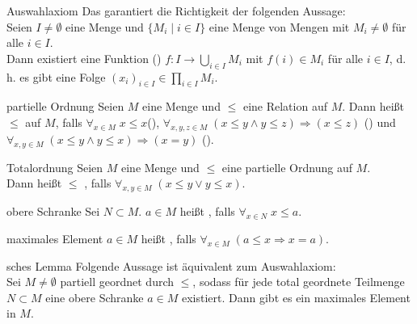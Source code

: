 \begin{Def}{Auswahlaxiom}
    Das  garantiert die Richtigkeit
    der folgenden Aussage:\\
    Seien $I \not= \emptyset$ eine Menge und
    $\{M_i \;|\; i \in I\}$ eine Menge von Mengen mit
    $M_i \not= \emptyset$ für alle $i \in I$.\\
    Dann existiert eine Funktion ()
    $f \colon I \rightarrow \bigcup_{i \in I} M_i$ mit
    $f(i) \in M_i$ für alle $i \in I$,
    d.\,h. es gibt eine Folge $(x_i)_{i \in I} \in \prod_{i \in I} M_i$.
\end{Def}

\linie

\begin{Def}{partielle Ordnung}
    Seien $M$ eine Menge und $\le$ eine Relation auf $M$.
    Dann heißt $\le$  auf $M$, falls
    $\forall_{x \in M}\; x \le x$(),
    $\forall_{x, y, z \in M}\;
    (x \le y \land y \le z) \Rightarrow (x \le z)$ () und
    $\forall_{x, y \in M}\; (x \le y \land y \le x) \Rightarrow (x = y)$
    ().
\end{Def}

\begin{Def}{Totalordnung}
    Seien $M$ eine Menge und $\le$ eine partielle Ordnung auf $M$.\\
    Dann heißt $\le$ , falls
    $\forall_{x, y \in M}\; (x \le y \lor y \le x)$.
\end{Def}

\begin{Def}{obere Schranke}
    Sei $N \subset M$.
    $a \in M$ heißt , falls
    $\forall_{x \in N}\; x \le a$.
\end{Def}

\begin{Def}{maximales Element}
    $a \in M$ heißt , falls
    $\forall_{x \in M}\; (a \le x \Rightarrow x = a)$.
\end{Def}

\begin{Prop}{sches Lemma}
    Folgende Aussage ist äquivalent zum Auswahlaxiom:\\
    Sei $M \not= \emptyset$ partiell geordnet durch $\le$, sodass
    für jede total geordnete Teilmenge $N \subset M$ eine obere Schranke
    $a \in M$ existiert.
    Dann gibt es ein maximales Element in $M$.
\end{Prop}

